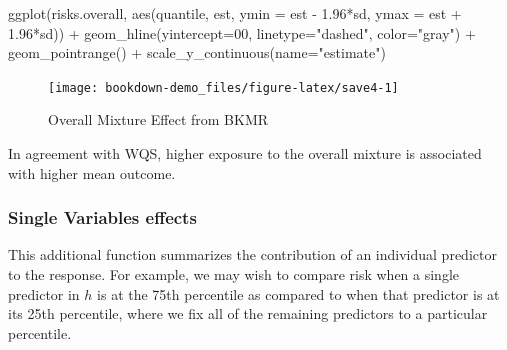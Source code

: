 \documentclass[
]{book}
\newenvironment{Shaded}{\begin{snugshade}}{\end{snugshade}}
\newcommand{\AttributeTok}[1]{\textcolor[rgb]{0.77,0.63,0.00}{#1}}
\newcommand{\DecValTok}[1]{\textcolor[rgb]{0.00,0.00,0.81}{#1}}
\newcommand{\FloatTok}[1]{\textcolor[rgb]{0.00,0.00,0.81}{#1}}
\newcommand{\FunctionTok}[1]{\textcolor[rgb]{0.00,0.00,0.00}{#1}}
\newcommand{\NormalTok}[1]{#1}
\newcommand{\SpecialCharTok}[1]{\textcolor[rgb]{0.00,0.00,0.00}{#1}}
\newcommand{\StringTok}[1]{\textcolor[rgb]{0.31,0.60,0.02}{#1}}
\begin{document}
\begin{Shaded}
\begin{Highlighting}[]
\FunctionTok{ggplot}\NormalTok{(risks.overall, }\FunctionTok{aes}\NormalTok{(quantile, est, }\AttributeTok{ymin =}\NormalTok{ est }\SpecialCharTok{{-}} \FloatTok{1.96}\SpecialCharTok{*}\NormalTok{sd, }\AttributeTok{ymax =}\NormalTok{ est }\SpecialCharTok{+} \FloatTok{1.96}\SpecialCharTok{*}\NormalTok{sd)) }\SpecialCharTok{+}  
  \FunctionTok{geom\_hline}\NormalTok{(}\AttributeTok{yintercept=}\DecValTok{00}\NormalTok{, }\AttributeTok{linetype=}\StringTok{"dashed"}\NormalTok{, }\AttributeTok{color=}\StringTok{"gray"}\NormalTok{) }\SpecialCharTok{+} 
  \FunctionTok{geom\_pointrange}\NormalTok{() }\SpecialCharTok{+} \FunctionTok{scale\_y\_continuous}\NormalTok{(}\AttributeTok{name=}\StringTok{"estimate"}\NormalTok{) }
\end{Highlighting}
\end{Shaded}

\begin{figure}[H]

{\centering \texttt{[image: bookdown-demo\_files/figure-latex/save4-1]} 

}

\caption{Overall Mixture Effect from BKMR}\label{fig:save4}
\end{figure}

In agreement with WQS, higher exposure to the overall mixture is associated with higher mean outcome.

\hypertarget{single-variables-effects}{%
\subsubsection{Single Variables effects}\label{single-variables-effects}}

This additional function summarizes the contribution of an individual predictor to the response. For example, we may wish to compare risk when a single predictor in \(h\) is at the 75th percentile as compared to when that predictor is at its 25th percentile, where we fix all of the remaining predictors to a particular percentile.
\end{document}
